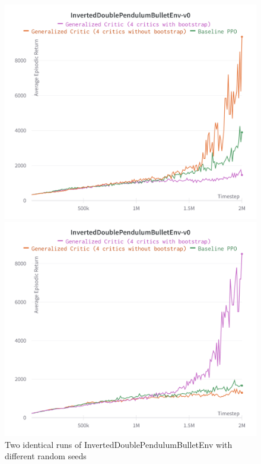 \begin{figure}[!htb]
\begin{minipage}[b]{.5\linewidth}
  \centering
  \centerline{\includegraphics[width=\linewidth]{images/idpseed90}}
\end{minipage}
\begin{minipage}[b]{.5\linewidth}
  \centering
  \centerline{\includegraphics[width=\linewidth]{images/idpseed80}}
\end{minipage}
  \caption{Two identical runs of InvertedDoublePendulumBulletEnv with different random seeds}
  \label{seeds}
\end{figure}

